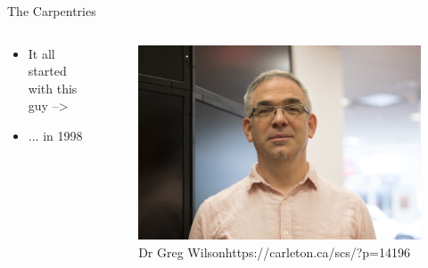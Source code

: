 \begin{frame}{The Carpentries}
	\begin{columns}[T]
		\begin{column}[c]{.5\textwidth}
			\begin{itemize}
				\item It all started with this guy -->
				\item ... in 1998
			\end{itemize}
		\end{column}

		\begin{column}[c]{.5\textwidth}
			\begin{figure}
				\centering
				\includegraphics[width=.9\textwidth]{images/dr_greg_wilson.jpg} \linebreak
				\caption*{Dr Greg Wilson\linebreak\tiny{https://carleton.ca/scs/?p=14196}}
			\end{figure}
		\end{column}
	\end{columns}
\end{frame}